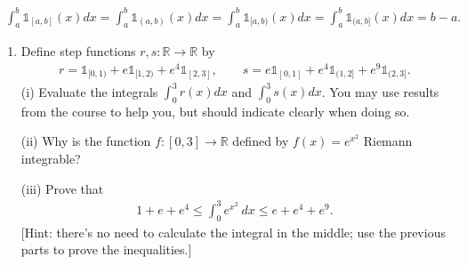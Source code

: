 \documentclass[letterpaper,10pt,english]{jupyterBook}
\begin{document}
\begin{equation*}
\begin{split}
\int_a^b\mathbb{1}_{[a,b]}(x)dx = \int_a^b\mathbb{1}_{(a,b)}(x)dx = \int_a^b\mathbb{1}_{[a,b)}(x)dx = \int_a^b\mathbb{1}_{(a,b]}(x)dx = b-a.
\end{split}
\end{equation*}\label{\detokenize{Problems:id69}}\begin{enumerate}
%
\setcounter{enumi}{68}
\item {} 
\sphinxAtStartPar
{} Define step functions \(r,s\colon \mathbb{R} \rightarrow \mathbb{R}\) by
\begin{equation*}
\begin{split}
    r = \mathbb{1}_{[0,1)} + e \mathbb{1}_{[1,2)} + e^4 \mathbb{1}_{[2,3]}, \qquad  s = e \mathbb{1}_{[0,1]} + e^4 \mathbb{1}_{(1,2]} + e^9 \mathbb{1}_{(2,3]}.
    \end{split}
\end{equation*}
\sphinxAtStartPar
(i) Evaluate the integrals \(\displaystyle\int_0^3 r(x)dx\) and \(\displaystyle\int_0^3 s(x)dx\).  You may use results from the course to help you, but should indicate clearly when doing so.

\sphinxAtStartPar
(ii) Why is the function \(f\colon [0,3]\rightarrow \mathbb{R}\) defined by \(f(x)=e^{x^2}\) Riemann integrable?

\sphinxAtStartPar
(iii) Prove that
\begin{equation*}
\begin{split}
    1+e+e^4 \leq \int_0^3 e^{x^2}\ dx \leq e+e^4+e^9.
    \end{split}
\end{equation*}
\sphinxAtStartPar
{[}Hint: there’s no need to calculate the integral in the middle; use the previous parts to prove the inequalities.{]}

\end{enumerate}
\end{document}
